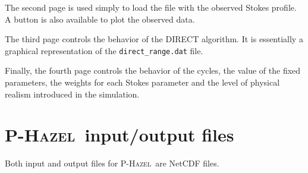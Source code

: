 \documentclass[12pt]{article}
\def\HM{\textsc{P-Hazel}}
\begin{document}
The second page is used simply to load the file with the observed Stokes profile. A button
is also available to plot the observed data.

The third page controls the behavior of the DIRECT algorithm. It is essentially a graphical
representation of the \texttt{direct\_range.dat} file.

Finally, the fourth page controls the behavior of the cycles, the value of the fixed parameters,
the weights for each Stokes parameter and the level of physical realism introduced in the
simulation.

\section{\HM\ input/output files}
\label{sec:phazel_files}
Both input and output files for \HM\ are NetCDF files. 
\end{document}
